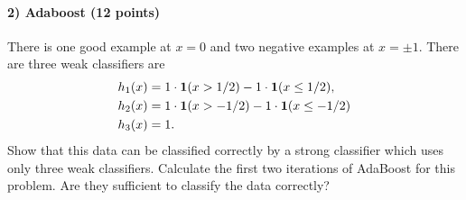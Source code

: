 \documentclass{article}
\begin{document}
\paragraph{2) Adaboost (12 points)} There is one good example at $x=0$ and two negative examples at $x = \pm 1$. There are three weak classifiers are
\begin{align*}
	h_1(x) & = 1\cdot{\bf1}(x > 1/2) -1\cdot{\bf1}(x \leq 1/2),\\
	h_2(x) & = 1\cdot{\bf1}(x > -1/2) -1\cdot{\bf1}(x \leq -1/2)\\
	h_3(x) & =1.
\end{align*}
Show that this data can be classified correctly by a strong classifier which uses only three weak classifiers. Calculate the first two iterations of AdaBoost for this problem. Are they sufficient to classify the data correctly?
\end{document}
